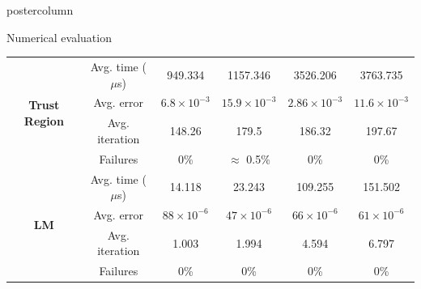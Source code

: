 \documentclass{beamer}
\begin{document}
\begin{frame}
\begin{columns}
\begin{column}{.57\textwidth}
\begin{beamercolorbox}[center]{postercolumn}
\begin{minipage}{.98\textwidth}
{\begin{myblock}{Numerical evaluation}
\begin{minipage}{0.65\linewidth}
{\begin{table}
\begin{tabular}{c c cc cc }
									\multirow{4}{*}{\textbf{Trust Region}} 
									& Avg. time ($\mu$s)   & 949.334   & 1157.346   & 3526.206   & 3763.735     \\
									& Avg. error           & $6.8 \times 10^{-3}$ & $15.9 \times 10^{-3}$ & $2.86 \times 10^{-3}$ & $11.6 \times 10^{-3}$ \\
									& Avg. iteration       & 148.26     & 179.5      & 186.32     & 197.67    \\
									& Failures             & 0\%        & $\approx$ 0.5\%        & 0\%        & 0\%       \\
									\hline
									\multirow{4}{*}{\textbf{LM}} 
									& Avg. time ($\mu$s)   & 14.118     & 23.243     & 109.255    & 151.502   \\
									& Avg. error           & $88 \times 10^{-6}$ & $47 \times 10^{-6}$ & $66 \times 10^{-6}$ & $61 \times 10^{-6}$ \\
									& Avg. iteration       & 1.003      & 1.994      & 4.594      & 6.797     \\
									& Failures             & 0\%        & 0\%        & 0\%        & 0\%       \\
									\hline
									\hline
								\end{tabular}
							\end{table}
						}
					\end{minipage}
					\hfill
					\begin{minipage}{0.30\linewidth}
						\begin{figure}[H]
							\centering
\end{figure}
\end{minipage}
\end{myblock}}
\end{minipage}
\end{beamercolorbox}
\end{column}
\end{columns}
\end{frame}
\end{document}
